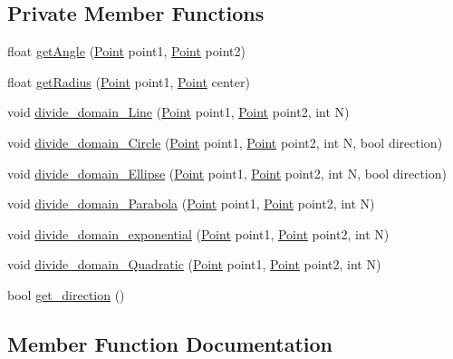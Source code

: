 \subsection*{Private Member Functions}
\begin{DoxyCompactItemize}
\item 
float \hyperlink{class_grid_points_a85035aa63c904cc066802c13c18d465e}{get\+Angle} (\hyperlink{class_point}{Point} point1, \hyperlink{class_point}{Point} point2)
\item 
float \hyperlink{class_grid_points_a9b32f73ce9f10c09c97069816c1253f0}{get\+Radius} (\hyperlink{class_point}{Point} point1, \hyperlink{class_point}{Point} center)
\item 
void \hyperlink{class_grid_points_a007b5f15c63c07f6c0101db9e42e26fa}{divide\+\_\+domain\+\_\+\+Line} (\hyperlink{class_point}{Point} point1, \hyperlink{class_point}{Point} point2, int N)
\item 
void \hyperlink{class_grid_points_a8910c072b4a9839f912513a4bbf517c0}{divide\+\_\+domain\+\_\+\+Circle} (\hyperlink{class_point}{Point} point1, \hyperlink{class_point}{Point} point2, int N, bool direction)
\item 
void \hyperlink{class_grid_points_a353c592f1a0bffc5bee6e240afb7ce63}{divide\+\_\+domain\+\_\+\+Ellipse} (\hyperlink{class_point}{Point} point1, \hyperlink{class_point}{Point} point2, int N, bool direction)
\item 
void \hyperlink{class_grid_points_aad9b87e262e10af26a9925ccc9f0cc30}{divide\+\_\+domain\+\_\+\+Parabola} (\hyperlink{class_point}{Point} point1, \hyperlink{class_point}{Point} point2, int N)
\item 
void \hyperlink{class_grid_points_a3d273573aa628b70644a694a50d9b696}{divide\+\_\+domain\+\_\+exponential} (\hyperlink{class_point}{Point} point1, \hyperlink{class_point}{Point} point2, int N)
\item 
void \hyperlink{class_grid_points_a16e4eb481007bf863d78b930b836eb23}{divide\+\_\+domain\+\_\+\+Quadratic} (\hyperlink{class_point}{Point} point1, \hyperlink{class_point}{Point} point2, int N)
\item 
bool \hyperlink{class_grid_points_a5babb6d204dcab7adcc25715eba8b0e6}{get\+\_\+direction} ()
\end{DoxyCompactItemize}


\subsection{Member Function Documentation}
\hypertarget{class_grid_points_a2cd9f7d761cd106dc340b2a4b10da33c}{}
